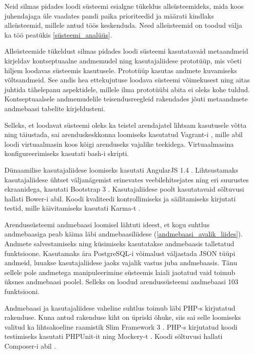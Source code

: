 \documentclass[a4paper,12pt]{article} %
\begin{document}
Neid silmas pidades loodi süsteemi esialgne tükeldus allsüsteemideks, mida koos juhendajaga üle vaadates pandi paika prioriteedid ja määrati kindlaks allsüsteemid, millele antud töös keskenduda. Need allsüsteemid on toodud välja ka töö peatükis \ref{süsteemi_analüüs}.
\par


Allsüsteemide tükeldust silmas pidades loodi süsteemi kasutatavaid metaandmeid kirjeldav kontseptuaalne andmemudel ning kasutajaliidese prototüüp, mis võeti hiljem loodavas süsteemis kasutusele. 
Prototüüp kasutas andmete kuvamiseks võltsandmeid. See andis hea ettekujutuse loodava süsteemi võimekusest ning aitas juhtida tähelepanu aspektidele, millele ilma prototüübi abita ei oleks kohe tuldud. Kontseptuaalsele andmemudelile teisendusreegleid rakendades jõuti metaandmete andmebaasi tabelite kirjeldusteni.\par

Selleks, et loodavat süsteemi oleks ka teistel arendajatel lihtsam kasutusele võtta ning täiustada, sai arenduskeskkonna loomiseks kasutatud Vagrant-i \cite{Vagrant}, mille abil loodi virtuaalmasin koos kõigi arenduseks vajalike teekidega. Virtuaalmasina konfigureerimiseks kasutati bash-i skripti.\par

Dünaamilise kasutajaliidese loomiseks kasutati AngularJS 1.4 \cite{AngularJS}. Lihtsustamaks kasutajaliidese ühtset väljanägemist erinevates veebilehitsejates ning eri suurustes ekraanidega, kasutati Bootstrap 3 \cite{Bootstrap}. Kasutajaliidese poolt kasutatavaid sõltuvusi hallati Bower-i \cite{Bower} abil. Koodi kvaliteedi kontrollimiseks ja säilitamiseks kirjutati testid, mille käivitamiseks kasutati Karma-t \cite{Karma}.\par

Arendussüsteemi andmebaasi loomisel lähtuti ideest, et kogu suhtlus andmebaasiga peab käima läbi andmebaasiliidese (\ref{andmebaasi_avalik_liides}). Andmete salvestamiseks ning küsimiseks kasutatakse andmebaasis talletatud funktsioone. Kasutamaks ära PostgreSQL-i \cite{PostgreSQL} võimalust väljastada JSON tüüpi andmeid, luuakse kasutajaliidese jaoks vajalik vastus juba andmebaasis. Tänu sellele pole andmetega manipuleerimine süsteemis laiali jaotatud vaid toimub üksnes andmebaasi poolel. Selleks on loodud arendussüsteemi andmebaasi 103 funktsiooni.\par

Andmebaasi ja kasutajaliidese vaheline suhtlus toimub läbi PHP-s \cite{PHP} kirjutatud rakenduse. Kuna antud rakenduse kiht on üpriski õhuke, siis sai selle loomiseks valitud ka lihtsakoeline raamistik Slim Framework 3 \cite{SlimFW}. PHP-s kirjutatud koodi testimiseks kasutati PHPUnit-it \cite{PHPUnit} ning Mockery-t \cite{Mockery}. Koodi sõltuvusi hallati Composer-i abil \cite{Composer}. \par
\end{document}
